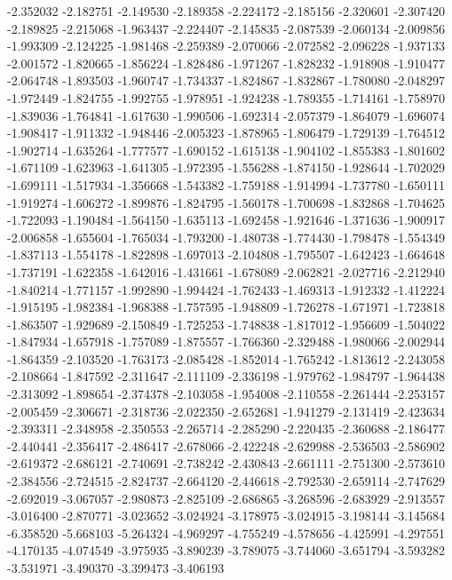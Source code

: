 -2.352032
-2.182751
-2.149530
-2.189358
-2.224172
-2.185156
-2.320601
-2.307420
-2.189825
-2.215068
-1.963437
-2.224407
-2.145835
-2.087539
-2.060134
-2.009856
-1.993309
-2.124225
-1.981468
-2.259389
-2.070066
-2.072582
-2.096228
-1.937133
-2.001572
-1.820665
-1.856224
-1.828486
-1.971267
-1.828232
-1.918908
-1.910477
-2.064748
-1.893503
-1.960747
-1.734337
-1.824867
-1.832867
-1.780080
-2.048297
-1.972449
-1.824755
-1.992755
-1.978951
-1.924238
-1.789355
-1.714161
-1.758970
-1.839036
-1.764841
-1.617630
-1.990506
-1.692314
-2.057379
-1.864079
-1.696074
-1.908417
-1.911332
-1.948446
-2.005323
-1.878965
-1.806479
-1.729139
-1.764512
-1.902714
-1.635264
-1.777577
-1.690152
-1.615138
-1.904102
-1.855383
-1.801602
-1.671109
-1.623963
-1.641305
-1.972395
-1.556288
-1.874150
-1.928644
-1.702029
-1.699111
-1.517934
-1.356668
-1.543382
-1.759188
-1.914994
-1.737780
-1.650111
-1.919274
-1.606272
-1.899876
-1.824795
-1.560178
-1.700698
-1.832868
-1.704625
-1.722093
-1.190484
-1.564150
-1.635113
-1.692458
-1.921646
-1.371636
-1.900917
-2.006858
-1.655604
-1.765034
-1.793200
-1.480738
-1.774430
-1.798478
-1.554349
-1.837113
-1.554178
-1.822898
-1.697013
-2.104808
-1.795507
-1.642423
-1.664648
-1.737191
-1.622358
-1.642016
-1.431661
-1.678089
-2.062821
-2.027716
-2.212940
-1.840214
-1.771157
-1.992890
-1.994424
-1.762433
-1.469313
-1.912332
-1.412224
-1.915195
-1.982384
-1.968388
-1.757595
-1.948809
-1.726278
-1.671971
-1.723818
-1.863507
-1.929689
-2.150849
-1.725253
-1.748838
-1.817012
-1.956609
-1.504022
-1.847934
-1.657918
-1.757089
-1.875557
-1.766360
-2.329488
-1.980066
-2.002944
-1.864359
-2.103520
-1.763173
-2.085428
-1.852014
-1.765242
-1.813612
-2.243058
-2.108664
-1.847592
-2.311647
-2.111109
-2.336198
-1.979762
-1.984797
-1.964438
-2.313092
-1.898654
-2.374378
-2.103058
-1.954008
-2.110558
-2.261444
-2.253157
-2.005459
-2.306671
-2.318736
-2.022350
-2.652681
-1.941279
-2.131419
-2.423634
-2.393311
-2.348958
-2.350553
-2.265714
-2.285290
-2.220435
-2.360688
-2.186477
-2.440441
-2.356417
-2.486417
-2.678066
-2.422248
-2.629988
-2.536503
-2.586902
-2.619372
-2.686121
-2.740691
-2.738242
-2.430843
-2.661111
-2.751300
-2.573610
-2.384556
-2.724515
-2.824737
-2.664120
-2.446618
-2.792530
-2.659114
-2.747629
-2.692019
-3.067057
-2.980873
-2.825109
-2.686865
-3.268596
-2.683929
-2.913557
-3.016400
-2.870771
-3.023652
-3.024924
-3.178975
-3.024915
-3.198144
-3.145684
-6.358520
-5.668103
-5.264324
-4.969297
-4.755249
-4.578656
-4.425991
-4.297551
-4.170135
-4.074549
-3.975935
-3.890239
-3.789075
-3.744060
-3.651794
-3.593282
-3.531971
-3.490370
-3.399473
-3.406193
